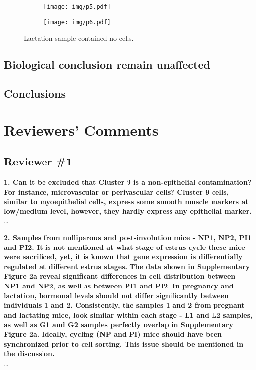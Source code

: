 \documentclass{article}
\begin{document}
\begin{figure}
    \begin{subfigure}[c]{0.5\textwidth}
	\texttt{[image: img/p5.pdf]}
    \caption{}
    \end{subfigure}
    \begin{subfigure}[c]{0.5\textwidth}
	\texttt{[image: img/p6.pdf]}
    \caption{}
    \end{subfigure}
    \caption{Lactation sample contained no cells.
    }
    \label{F3}
\end{figure}

\subsection*{Biological conclusion remain unaffected}
\subsection*{Conclusions}
\newpage
\section*{Reviewers' Comments}
\subsection*{Reviewer \#1}
\textbf{1. Can it be excluded that Cluster 9 is a non-epithelial contamination? For instance, microvascular or perivascular cells? Cluster 9 cells, similar to myoepithelial cells, express some smooth muscle markers at low/medium level, however, they hardly express any epithelial marker.}\\
\ldots

\textbf{2. Samples from nulliparous and post-involution mice - NP1, NP2, PI1 and PI2. It is not mentioned at what stage of estrus cycle these mice were sacrificed, yet, it is known that gene expression is differentially regulated at different estrus stages. The data shown in Supplementary Figure 2a reveal significant differences in cell distribution between NP1 and NP2, as well as between PI1 and PI2. In pregnancy and lactation, hormonal levels should not differ significantly between individuals 1 and 2. Consistently, the samples 1 and 2 from pregnant and lactating mice, look similar within each stage - L1 and L2 samples, as well as G1 and G2 samples perfectly overlap in Supplementary Figure 2a. Ideally, cycling (NP and PI) mice should have been synchronized prior to cell sorting. This issue should be mentioned in the discussion.}\\
\ldots
\end{document}
